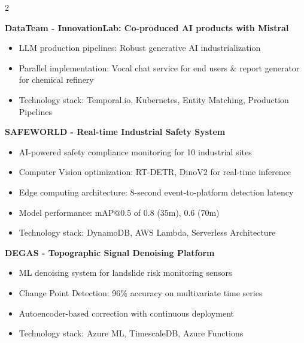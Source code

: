 \documentclass[10pt,a4paper,withhyper]{altacv}
\begin{document}
\begin{paracol}{2}

\textbf{DataTeam - InnovationLab: Co-produced AI products with Mistral}
\begin{itemize}
\item LLM production pipelines: Robust generative AI industrialization
\item Parallel implementation: Vocal chat service for end users \& report generator for chemical refinery
\item Technology stack: Temporal.io, Kubernetes, Entity Matching, Production Pipelines
\end{itemize}

\divider

\textbf{SAFEWORLD - Real-time Industrial Safety System}
\begin{itemize}
\item AI-powered safety compliance monitoring for 10 industrial sites
\item Computer Vision optimization: RT-DETR, DinoV2 for real-time inference
\item Edge computing architecture: 8-second event-to-platform detection latency
\item Model performance: mAP@0.5 of 0.8 (35m), 0.6 (70m)
\item Technology stack: DynamoDB, AWS Lambda, Serverless Architecture
\end{itemize}

\divider

\textbf{DEGAS - Topographic Signal Denoising Platform}
\begin{itemize}
\item ML denoising system for landslide risk monitoring sensors
\item Change Point Detection: 96\% accuracy on multivariate time series
\item Autoencoder-based correction with continuous deployment
\item Technology stack: Azure ML, TimescaleDB, Azure Functions
\end{itemize}


\end{paracol}
\end{document}
